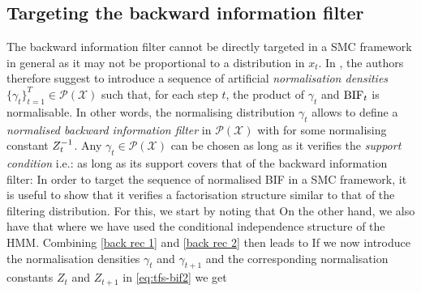\subsection{Targeting the backward information filter}
The backward information filter cannot be directly targeted in a SMC framework in general as it may not be proportional to a distribution in $x_{t}$. 
In \citet{briers10}, the authors therefore suggest to introduce a sequence of artificial \emph{normalisation densities} $\{\gamma_{t}\}_{t=1}^{T}\in\mathcal P(\mathcal X)$ such that, for each step $t$, the product of $\gamma_{t}$ and $\text{BIF}_{t}$ is normalisable. 
In other words, the normalising distribution $\gamma_{t}$ allows to define a \emph{normalised backward information filter} in $\mathcal P(\mathcal X)$ with
%
%
for some normalising constant $Z^{-1}_{t}$.
Any $\gamma_{t}\in\mathcal P(\mathcal X)$ can be chosen as long as it verifies the \emph{support condition} i.e.: as long as its support covers that of the backward information filter:
%
%
In order to target the sequence of normalised BIF in a SMC framework, it is useful to show that it verifies a factorisation structure similar to that of the filtering distribution. For this, we start by noting that
%
%
On the other hand, we also have that
%
%
where we have used the conditional independence structure of the HMM. 
Combining \eqref{back rec 1} and \eqref{back rec 2} then leads to
%
%
If we now introduce the normalisation densities $\gamma_{t}$ and $\gamma_{t+1}$ and the corresponding normalisation constants $Z_{t}$ and $Z_{t+1}$ in \eqref{eq:tfs-bif2} we get
%
